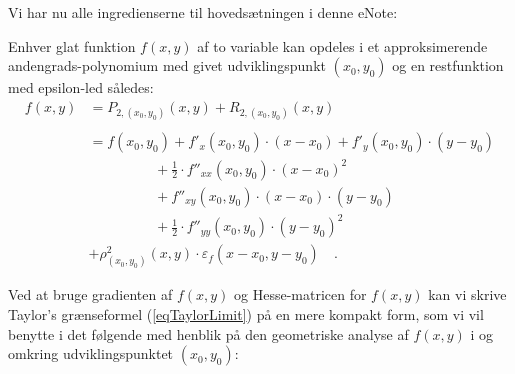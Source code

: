 Vi har nu alle ingredienserne til hovedsætningen i denne eNote:

\begin{theorem} \label{thmTaylor2Var}
Enhver glat funktion $f(x,y)$ af to variable kan opdeles i et approksimerende andengrads-polynomium  med givet udviklingspunkt $(x_{0}, y_{0})$ og en restfunktion  med epsilon-led således:
\begin{equation} \label{eqTaylorLimit}
\begin{aligned}
f(x,y) &= P_{2, (x_{0}, y_{0})}(x,y) + R_{2, (x_{0}, y_{0})}(x,y) \\ \\
&= f(x_{0}, y_{0}) + f'_{x}(x_{0}, y_{0})\cdot (x-x_{0}) + f'_{y}(x_{0}, y_{0})\cdot (y-y_{0}) \\
&\phantom{abcdefghij}+ \frac{1}{2}\cdot f''_{xx}(x_{0}, y_{0})\cdot (x-x_{0})^{2}  \\
&\phantom{abcdefghij}+ f''_{xy}(x_{0}, y_{0})\cdot (x-x_{0})\cdot (y-y_{0}) \\
&\phantom{abcdefghij}+ \frac{1}{2} \cdot f''_{yy}(x_{0}, y_{0}) \cdot (y-y_{0})^{2} \\
&+\rho^{2}_{(x_{0}, y_{0})}(x,y)\cdot \varepsilon_{f}(x-x_{0}, y-y_{0}) \quad .
\end{aligned}
\end{equation}
\end{theorem}



Ved at bruge gradienten af $f(x,y)$ og Hesse-matricen for $f(x,y)$ kan vi skrive Taylor's grænseformel
(\ref{eqTaylorLimit}) på en mere kompakt form, som vi vil benytte i det følgende med henblik på den geometriske analyse  af $f(x,y)$ i og omkring udviklingspunktet $(x_{0}, y_{0})$:

